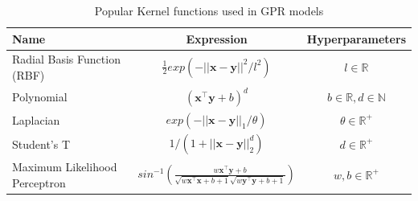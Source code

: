 \documentclass[sw, draft]{AGUTeX}
\begin{document}
\begin{table}
\caption{Popular Kernel functions used in GPR models}
\centering
\begin{tabular}{l c c}
\hline
 Name  & Expression & Hyperparameters  \\
\hline
  Radial Basis Function (RBF)  & $\frac{1}{2} exp(-||\mathbf{x} - \mathbf{y}||^2/l^2)$  & $l \in \mathbb{R}$   \\
  
  Polynomial  & $(\mathbf{x}^\intercal \mathbf{y} + b)^d$ & $b \in \mathbb{R}, d \in \mathbb{N}$   \\
  
  Laplacian  & $exp(-||\mathbf{x} - \mathbf{y}||_{1}/\theta)$  & $\theta \in \mathbb{R}^+$  \\
  
  Student's T  & $1/(1 + ||\mathbf{x} - \mathbf{y}||_{2}^d)$ & $d \in \mathbb{R}^{+}$\\
  
  Maximum Likelihood Perceptron  & $sin^{-1}(\frac{w\mathbf{x}^\intercal \mathbf{y} + b}{\sqrt{w\mathbf{x}^\intercal \mathbf{x} + b + 1} \sqrt{w\mathbf{y}^\intercal \mathbf{y} + b + 1}})$ & $w, b \in \mathbb{R}^{+}$\\
\hline
\end{tabular}
\label{table:kernel}
\end{table}



\end{document}
